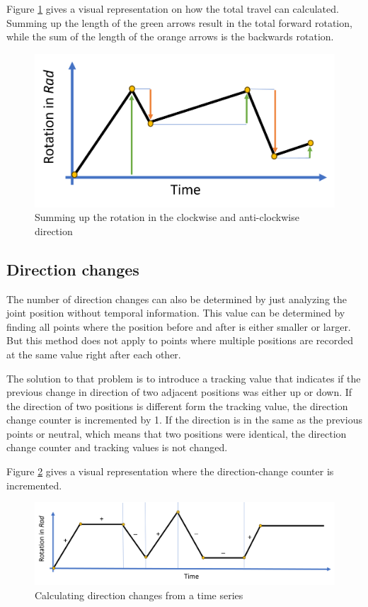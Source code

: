 Figure \ref{travel} gives a visual representation on how the total travel can calculated. Summing up the length of the green arrows result in the total forward rotation, while the sum of the length of the orange arrows is the backwards rotation.

\begin{figure}[H]
	\centerline{\includegraphics[scale=.6]{figures/travel.png}}
	\caption{Summing up the rotation in the clockwise and anti-clockwise direction }
	\label{travel}
\end{figure}

\subsection{Direction changes}
The number of direction changes can also be determined by just analyzing the joint position without temporal information. This value can be determined by finding all points where the position before and after is either smaller or larger. 
But this method does not apply to points where multiple positions are recorded at the same value right after each other. 

The solution to that problem is to introduce a tracking value that indicates if the previous change in direction of two adjacent positions was either up or down. If the direction of two positions is different form the tracking value, the direction change counter is incremented by 1. If the direction is in the same as the previous points or neutral, which means that two positions were identical, the direction change counter and tracking values is not changed.

Figure \ref{dirchange} gives a visual representation where the direction-change counter is incremented.

\begin{figure}[H]
	\centerline{\includegraphics[scale=.55]{figures/dirchange.png}}
	\caption{Calculating direction changes from a time series}
	\label{dirchange}
\end{figure}

